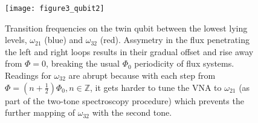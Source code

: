  \begin{figure}[h!]
 	\texttt{[image: figure3\_qubit2]}	
 	\caption{\small Transition frequencies on the twin qubit between the lowest lying levels, $ \omega_{21} $ (blue) and $ \omega_{32}$ (red). Assymetry in the flux penetrating the left and right loops results in their gradual offset and rise away from $ \Phi = 0 $, breaking the usual $ \Phi_0 $ periodicity of flux systems. Readings for $ \omega_{32} $ are abrupt because with each step from  $ \Phi = (n + \frac{1}{2})\Phi_0, n\in\mathbb{Z} $, it gets harder to tune the VNA to $ \omega_{21} $ (as part of the two-tone spectroscopy procedure) which prevents the further mapping of $ \omega_{32} $ with the second tone.
 		\label{fig:experiment}}
 \end{figure}

